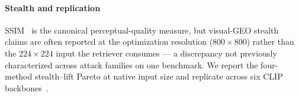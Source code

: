\paragraph{Stealth and replication} SSIM~\cite{wang2004ssim} is the canonical perceptual-quality measure, but visual-GEO stealth claims are often reported at the optimization resolution ($800{\times}800$) rather than the $224{\times}224$ input the retriever consumes --- a discrepancy not previously characterized across attack families on one benchmark. We report the four-method stealth--lift Pareto at native input size and replicate across six CLIP backbones~\cite{radford2021clip,cherti2023reproducible,fang2023eva02,zhai2023siglip}.
